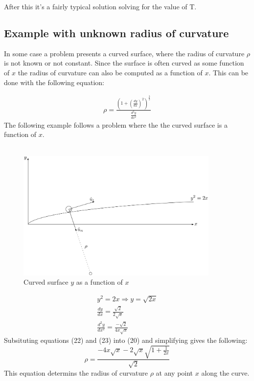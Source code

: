\documentclass[11pt, a4paper]{article}
\begin{document}
After this it's a fairly typical solution solving for the value of T.

\subsection{Example with unknown radius of curvature}
In some case a problem presents a curved surface, where the radius of curvature 
$\rho$ is not known or not constant. Since the surface is often curved as some function of $x$ the
radius of curvature can also be computed as a function of $x$. This can be done with
the following equation:

\begin{gather}
    \rho = \frac{(1+(\frac{dy}{dx})^2)^\frac{3}{2}}{\frac{d^2y}{dx^2}}
\end{gather}
The following example follows a problem where the the curved surface is a function of $x$.\\
\\
\begin{figure}[h]
    \centerline{\includegraphics[width=10cm]{images/Final_example.png}}    
    \caption{Curved surface $y$ as a function of $x$}
\end{figure}

\begin{gather}
    y^2 = 2x \Rightarrow y = \sqrt{2x}\\
    \frac{dy}{dx} = \frac{\sqrt{2}}{2\sqrt{x}}\\
    \frac{d^2y}{dx^2} = \frac{-\sqrt{2}}{4x\sqrt{x}}
\end{gather}
Subsituting equations (22) and (23) into (20) and simplifying gives the following:
\begin{equation}
    \rho = \frac{-4x\sqrt{x}-2\sqrt{x}\sqrt{1+\frac{1}{2x}}}{\sqrt{2}}    
\end{equation}
This equation determins the radius of curvature $\rho$ at any point $x$ along the curve.
\end{document}
